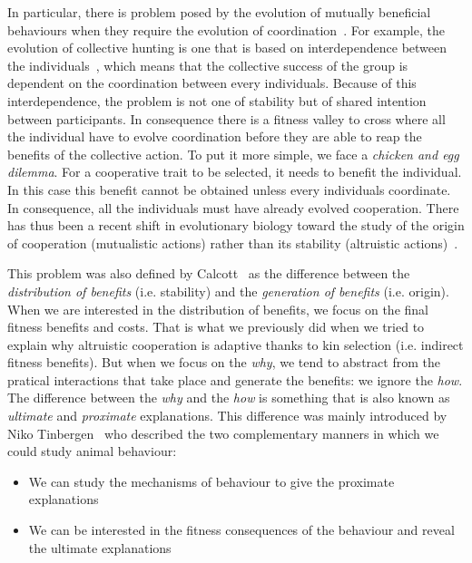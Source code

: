     In particular, there is problem posed by the evolution of mutually beneficial behaviours when they require the evolution of coordination~\parencite{Alvard2001, Alvard2003, Drea2009, Leimar2003}. For example, the evolution of collective hunting is one that is based on interdependence between the individuals~\parencite{Tomasello2012}, which means that the collective success of the group is dependent on the coordination between every individuals. Because of this interdependence, the problem is not one of stability but of shared intention between participants. In consequence there is a fitness valley to cross where all the individual have to evolve coordination before they are able to reap the benefits of the collective action. To put it more simple, we face a \emph{chicken and egg dilemma}. For a cooperative trait to be selected, it needs to benefit the individual. In this case this benefit cannot be obtained unless every individuals coordinate. In consequence, all the individuals must have already evolved cooperation. There has thus been a recent shift in evolutionary biology toward the study of the origin of cooperation (mutualistic actions) rather than its stability (altruistic actions)~\parencite{Forber2015}.

    This problem was also defined by Calcott~\parencite{Calcott2007a} as the difference between the \emph{distribution of benefits} (i.e. stability) and the \emph{generation of benefits} (i.e. origin). When we are interested in the distribution of benefits, we focus on the final fitness benefits and costs. That is what we previously did when we tried to explain why altruistic cooperation is adaptive thanks to kin selection (i.e. indirect fitness benefits). But when we focus on the \emph{why}, we tend to abstract from the pratical interactions that take place and generate the benefits: we ignore the \emph{how}. The difference between the \emph{why} and the \emph{how} is something that is also known as \emph{ultimate} and \emph{proximate} explanations. This difference was mainly introduced by Niko Tinbergen~\parencite{Tinbergen1963, West2007a} who described the two complementary manners in which we could study animal behaviour:

    \begin{itemize}
      \item {We can study the mechanisms of behaviour to give the proximate explanations}
      \item {We can be interested in the fitness consequences of the behaviour and reveal the ultimate explanations}
    \end{itemize}

